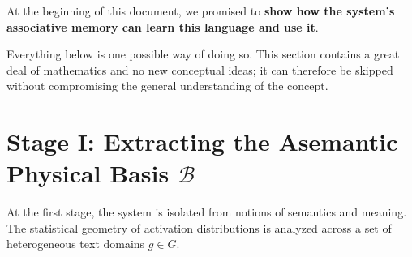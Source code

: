 \documentclass[11pt,a4paper]{article}
\begin{document}
At the beginning of this document, we promised to \textbf{show how the system's associative memory can learn this language and use it}.

Everything below is one possible way of doing so. This section contains a great deal of mathematics and no new conceptual ideas; it can therefore be skipped without compromising the general understanding of the concept.

\footnotesize
\section{Stage I: Extracting the Asemantic Physical Basis $\mathcal{B}$}
At the first stage, the system is isolated from notions of semantics and meaning. The statistical geometry of activation distributions is analyzed across a set of heterogeneous text domains $g\in G$.

\begin{center}
\end{center}
\end{document}
